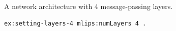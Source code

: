 A network architecture with 4 message-passing layers.
\begin{lstlisting}[language=turtle]
ex:setting-layers-4 mlips:numLayers 4 .
\end{lstlisting}
